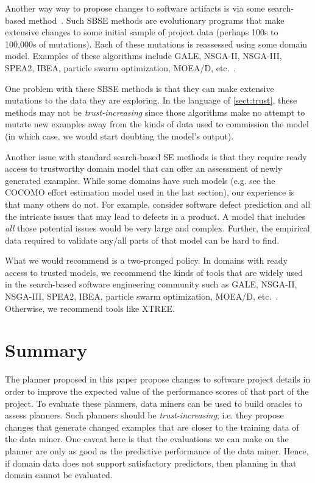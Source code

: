 \documentclass{sig-alternate}
\newcommand{\tion}[1]{\textsection\ref{sect:#1}}
\begin{document}
Another way way to propose changes to software artifacts
is   via some search-based method~\cite{Harman2009,Harman2011}. Such SBSE methods are   evolutionary programs that 
make
 extensive changes to  some initial sample of project data
 (perhaps 
100s to 100,000s of mutations). Each of these mutations
is reassessed using some domain model.
Examples of these algorithms include GALE, NSGA-II, NSGA-III, SPEA2, IBEA, particle swarm optimization, MOEA/D, etc.~\cite{krall14,deb00a,zit02,zit04,%
deb14,Cui2005a,zhang07:TEC}.

One problem with these   SBSE methods is that they can  make extensive mutations to the data they are exploring. In the language
of \tion{trust}, these methods may not be {\em trust-increasing} since those algorithms make no attempt
to mutate new examples away from the kinds of data used to commission the model (in which case, we would
start doubting the model's output).

Another issue with standard search-based SE methods is that they require ready access to 
trustworthy domain model that can offer an assessment
of newly generated examples. While some domains have such models (e.g. see the COCOMO effort estimation model
used in the last section), our experience is that many others do not.  For example, 
consider software defect prediction and all the intricate issues that may lead to defects in a product. A model that includes {\em all} those
potential issues would be very large and complex. Further,
the empirical data required to validate any/all parts
of that model can be hard to find.

What we would recommend is a two-pronged policy.
In domains with ready access to trusted models, we recommend
the kinds of tools that are widely used in the search-based
software engineering community such as GALE, NSGA-II, NSGA-III, SPEA2, IBEA, particle swarm optimization, MOEA/D, etc.~\cite{krall14,deb00a,zit02,zit04,%
deb14,Cui2005a,zhang07:TEC}. Otherwise, we recommend tools like XTREE.



\section{Summary}

The planner proposed in this paper propose changes to software project details in order to improve the expected
value of the performance scores of that part of the project.
To evaluate these planners,
data miners can be used to build oracles to assess planners.
Such planners should be {\em trust-increasing}; i.e. they propose changes that generate
changed examples that are closer to the training data of the data miner.
One caveat here is that the evaluations we can make on the planner are only as good as the predictive
performance of the data miner. Hence, if domain data does not support satisfactory predictors, then
planning in that domain cannot be evaluated.
\end{document}
